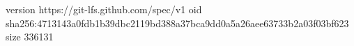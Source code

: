 version https://git-lfs.github.com/spec/v1
oid sha256:4713143a0fdb1b39dbc2119bd388a37bca9dd0a5a26aee63733b2a03f03bf623
size 336131
